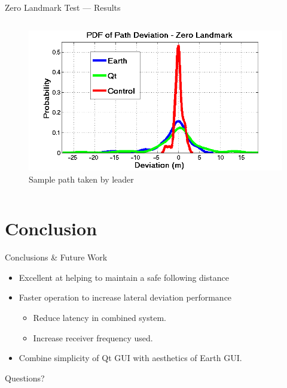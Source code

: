 \documentclass{beamer}
\begin{document}
\begin{frame}{Zero Landmark Test --- Results}
\begin{columns}
\begin{column}{0.5\textwidth}
\begin{figure}
          \end{figure}
          \vspace{-20pt}
          \begin{figure}
            \includegraphics[width=\textwidth]{../graphics/pdf_zero_landmark_deviation.png}
            \caption{\footnotesize Sample path taken by leader}
          \end{figure}
        \end{column}
      \end{columns}
    \end{frame}



\section{Conclusion}

  \begin{frame}{Conclusions \& Future Work}
    \begin{itemize}
      \item Excellent at helping to maintain a safe following distance
      \item Faster operation to increase lateral deviation performance
        \begin{itemize}
          \item Reduce latency in combined system.
          \item Increase receiver frequency used.
        \end{itemize}
      \item Combine simplicity of Qt GUI with aesthetics of Earth GUI.
    \end{itemize}
  \end{frame}

  \begin{frame}{}
    \centering \Huge Questions?
  \end{frame}
\end{document}
